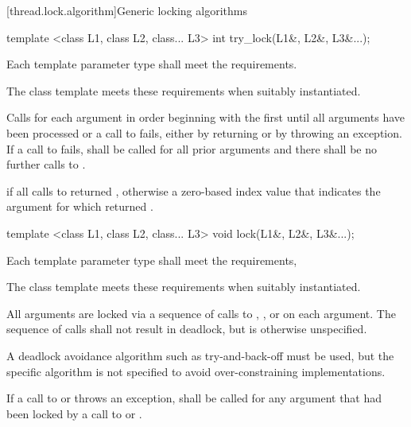 [thread.lock.algorithm]{Generic locking algorithms}

%
\begin{itemdecl}
template <class L1, class L2, class... L3> int try_lock(L1&, L2&, L3&...);
\end{itemdecl}

\begin{itemdescr}
\pnum
\requires Each template parameter type shall meet the  requirements. \begin{note} The
 class template meets these requirements when suitably instantiated.
\end{note}

\pnum
\effects Calls  for each argument in order beginning with the
first until all arguments have been processed or a call to  fails,
either by returning  or by throwing an exception. If a call to
 fails,  shall be called for all prior arguments
and there shall be no further calls to .

\pnum
\returns {} if all calls to  returned ,
otherwise a zero-based index value that indicates the argument for which 
returned .
\end{itemdescr}

%
\begin{itemdecl}
template <class L1, class L2, class... L3> void lock(L1&, L2&, L3&...);
\end{itemdecl}

\begin{itemdescr}
\pnum
\requires Each template parameter type shall meet the  requirements,
\begin{note} The
 class template meets these requirements when suitably instantiated.
\end{note}

\pnum
\effects All arguments are locked via a sequence of calls to ,
, or  on each argument. The sequence of calls shall
not result in deadlock, but is otherwise unspecified. \begin{note} A deadlock avoidance
algorithm such as try-and-back-off must be used, but the specific algorithm is not
specified to avoid over-constraining implementations. \end{note} If a call to
 or  throws an exception,  shall be
called for any argument that had been locked by a call to  or
.
\end{itemdescr}

